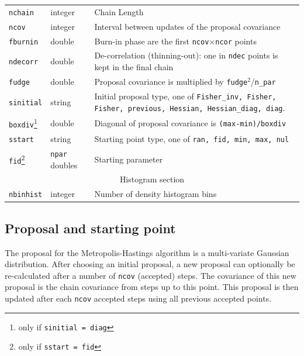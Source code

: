 \documentclass[11pt, chapterprefix, headsepline]{scrartcl}
\newcommand{\onlyif}[2]{\footnote{only if \texttt{#1 =\; #2}}}
\begin{document}
\begin{appendix}
\begin{table}
\begin{minipage}{\textwidth}
  \begin{tabular}{llp{\spaltedrei}} \hline\hline
    \texttt{nchain}  & integer & Chain Length\\
    \texttt{ncov}    & integer & Interval between updates of the proposal covariance \\
    \texttt{fburnin} & double & Burn-in phase are the first
                       \texttt{ncov}$\times$\texttt{ncor} points\\
    \texttt{ndecorr} & double & De-correlation (thinning-out): one in
    \texttt{ndec} points is kept in the final chain\\
    \texttt{fudge}   & double & Proposal covariance is multiplied by
    \texttt{fudge$^2$}/\texttt{n\_par} \\
    \texttt{sinitial} & string & Initial proposal type, one of
    \texttt{Fisher\_inv, Fisher, Fisher, previous, Hessian,
      Hessian\_diag, diag}. \\
    \texttt{boxdiv}\onlyif{sinitial}{diag} & double & Diagonal of proposal covariance is 
    \texttt{(max-min)/boxdiv} \\
    \texttt{sstart} & string & Starting point type, one of \texttt{ran,
      fid, min, max, nul} \\
    \texttt{fid}\onlyif{sstart}{fid} & \texttt{npar} doubles & Starting parameter \\
    \hline
    \multicolumn{3}{c}{Histogram section} \\
    \hline
    \texttt{nbinhist} & integer & Number of density histogram bins \\ \hline\hline
  \end{tabular}
\end{minipage}

\end{table}



\subsection{Proposal and starting point}
\label{sec:mcmc_proposal}

The proposal for the Metropolis-Hastings algorithm is a multi-variate
Gaussian distribution. After choosing an initial proposal, a new
proposal can optionally be re-calculated after a number of
\texttt{ncov} (accepted) steps. The covariance of this new proposal is
the chain covariance from steps up to this point. This proposal is
then updated after each \texttt{ncov} accepted steps using all
previous accepted points.


\end{appendix}
\end{document}
